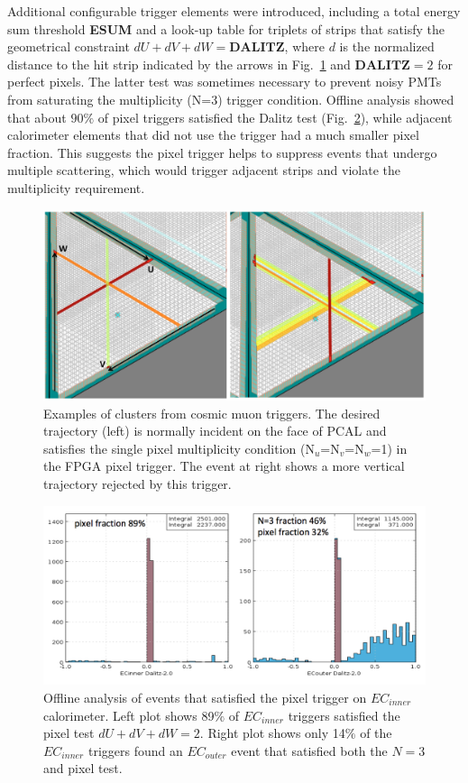 Additional configurable trigger elements were introduced, including a total energy sum threshold \textbf{ESUM} and a look-up table for triplets of strips that satisfy the geometrical constraint $dU+dV+dW=\textbf{DALITZ}$, where $d$ is the normalized distance to the hit strip indicated by the arrows in Fig.~\ref{fig:pcal_cosmic_1} and $\textbf{DALITZ}=2$ for perfect pixels.  The latter test was sometimes necessary to prevent noisy PMTs from saturating the multiplicity (N=3) trigger condition.  Offline analysis showed that about $90\%$ of pixel triggers satisfied the Dalitz test (Fig.~\ref{fig:ec_offline}), while adjacent calorimeter elements that did not use the trigger had a much smaller pixel fraction.  This suggests the pixel trigger helps to suppress events that undergo multiple scattering, which would trigger adjacent strips and violate the multiplicity requirement.

\begin{figure}[!htb]
 	\centering
  	\includegraphics[width=0.95\columnwidth,keepaspectratio]{img/TwoClusters.png}
 	\caption{Examples of clusters from cosmic muon triggers.  The desired trajectory (left) is normally incident on the face of PCAL and satisfies the single pixel multiplicity condition (N$_u$=N$_v$=N$_w$=1) in the FPGA pixel trigger. The event at right shows a more vertical trajectory rejected by this trigger.}
	\label{fig:pcal_cosmic_1}
\end{figure}

\begin{figure}[!htb]
 	\centering
  	\includegraphics[width=1.0\columnwidth,keepaspectratio]{img/PixelFraction.png}
 	\caption{Offline analysis of events that satisfied the pixel trigger on $EC_{inner}$  calorimeter.  Left plot shows 89$\%$ of $EC_{inner}$  triggers satisfied the pixel test $dU+dV+dW=2$.  Right plot shows only 14$\%$ of the $EC_{inner}$ triggers found an $EC_{outer}$ event that satisfied both the $N=3$ and pixel test.}
	\label{fig:ec_offline}
\end{figure}


